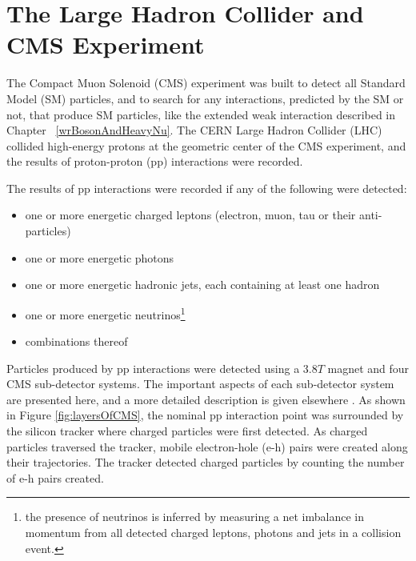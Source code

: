\chapter{The Large Hadron Collider and CMS Experiment}
\label{sec:experiment_chapter}
The Compact Muon Solenoid (CMS) experiment was built to detect all Standard Model (SM) particles, and to
search for any interactions, predicted by the SM or not, that produce SM particles, like the extended 
weak interaction described in Chapter ~\ref{wrBosonAndHeavyNu}.  The CERN Large Hadron Collider (LHC) 
collided high-energy protons at the geometric center of the CMS experiment, and the results of proton-proton (pp) 
interactions were recorded.

The results of pp interactions were recorded if any of the following were detected:
\begin{itemize}
	\item one or more energetic charged leptons (electron, muon, tau or their anti-particles)
	\item one or more energetic photons
	\item one or more energetic hadronic jets, each containing at least one hadron
	\item one or more energetic neutrinos\footnote{the presence of neutrinos is inferred by measuring a net imbalance in 
		momentum from all detected charged leptons, photons and jets in a collision event.}
	\item combinations thereof
\end{itemize}
Particles produced by pp interactions were detected using a 3.8$\unit{T}$ magnet and four CMS 
sub-detector systems.  The important aspects of each sub-detector system are presented here, and a more detailed 
description is given elsewhere \cite{cmsDetectorPaper}.  As shown in Figure \ref{fig:layersOfCMS}, the nominal pp interaction point 
was surrounded by the silicon tracker where charged particles were first detected.  As charged particles traversed
the tracker, mobile electron-hole (e-h) pairs were created along their trajectories.  The tracker detected 
charged particles by counting the number of e-h pairs created.

